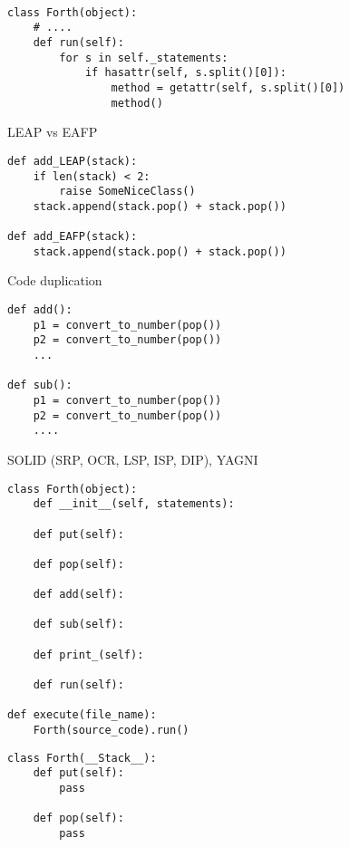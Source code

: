 \documentclass{article}
\begin{document}
\begin{lstlisting}

class Forth(object):
    # ....
    def run(self):
        for s in self._statements:
            if hasattr(self, s.split()[0]):
                method = getattr(self, s.split()[0])
                method()
\end{lstlisting}
\newpage

\begin{center}LEAP vs EAFP\end{center}
\begin{lstlisting}
def add_LEAP(stack):
    if len(stack) < 2:
        raise SomeNiceClass()
    stack.append(stack.pop() + stack.pop())

def add_EAFP(stack):
    stack.append(stack.pop() + stack.pop())
\end{lstlisting}
\newpage

\begin{center}Code duplication\end{center}
\begin{lstlisting}
def add():
    p1 = convert_to_number(pop())
    p2 = convert_to_number(pop())
    ...

def sub():
    p1 = convert_to_number(pop())
    p2 = convert_to_number(pop())
    ....
\end{lstlisting}
\newpage

\begin{center}SOLID (SRP, OCR, LSP, ISP, DIP), YAGNI\end{center}
\begin{lstlisting}
class Forth(object):
    def __init__(self, statements): 

    def put(self):

    def pop(self):

    def add(self):

    def sub(self):

    def print_(self):

    def run(self):

def execute(file_name):
    Forth(source_code).run()
\end{lstlisting}
\newpage

\begin{lstlisting}
class Forth(__Stack__):
    def put(self):
        pass

    def pop(self):
        pass
\end{lstlisting}
\newpage
\end{document}
